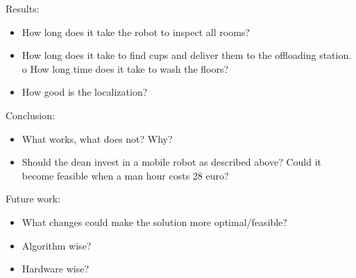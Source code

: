 Results:
\begin{itemize}
\item How long does it take the robot to inspect all rooms?
\item How long does it take to find cups and deliver them to the offloading station. o How long time does it take to wash the floors?
\item How good is the localization?
\end{itemize}

Conclusion:
\begin{itemize}
\item What works, what does not? Why?
\item Should the dean invest in a mobile robot as described above? Could it become feasible when a man hour costs 28 euro?
\end{itemize}

Future work:
\begin{itemize}
\item What changes could make the solution more optimal/feasible?
\item Algorithm wise? 
\item Hardware wise?
\end{itemize}